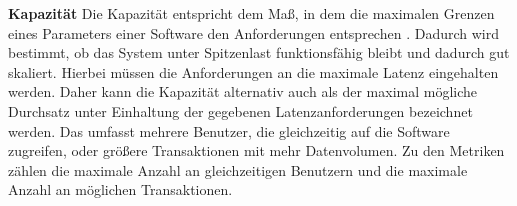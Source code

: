 \noindent
\textbf{Kapazität}\newline
Die Kapazität entspricht dem Maß, in dem die maximalen Grenzen eines Parameters einer Software den Anforderungen entsprechen \cite{ISOIEC.}. Dadurch wird bestimmt, ob das System unter Spitzenlast funktionsfähig bleibt und dadurch gut skaliert. Hierbei müssen die Anforderungen an die maximale Latenz eingehalten werden. Daher kann die Kapazität alternativ auch als der maximal mögliche Durchsatz unter Einhaltung der gegebenen Latenzanforderungen bezeichnet werden. \cite{Barbacci.1995}  Das umfasst mehrere Benutzer, die gleichzeitig auf die Software zugreifen, oder größere Transaktionen mit mehr Datenvolumen. Zu den Metriken zählen die maximale Anzahl an gleichzeitigen Benutzern und die maximale Anzahl an möglichen Transaktionen. 